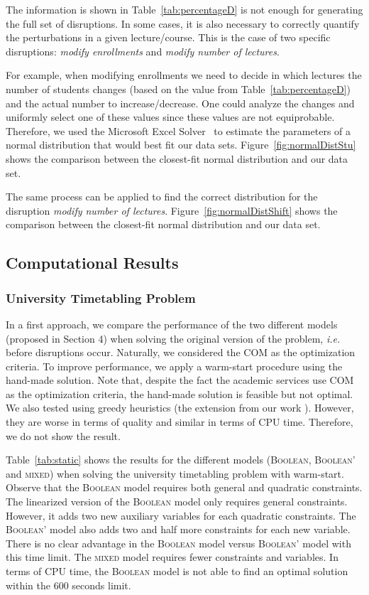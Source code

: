 \documentclass[twocolumn,natbib]{svjour3}          %
\newcounter{constraint}
\begin{document}
The information is shown in Table~\ref{tab:percentageD} is not enough for generating the full set of disruptions. In some cases, it is also necessary to correctly quantify the perturbations in a given lecture/course. This is the case of two specific disruptions: \textit{modify enrollments} and \textit{modify number of lectures}.

 For example, when modifying enrollments we need to decide in which lectures the number of students changes (based on the value from Table~\ref{tab:percentageD}) and the actual number to increase/decrease. One could analyze the changes and uniformly select one of these values since these values are not equiprobable. Therefore, we used the Microsoft Excel Solver~\citep{DBLP:journals/interfaces/FylstraLWW98} to estimate the parameters of a normal distribution that would best fit our data sets. Figure~\ref{fig:normalDistStu} shows the comparison between the closest-fit normal distribution and our data set.

 The same process can be applied to find the correct distribution for the disruption \textit{modify number of lectures}. Figure~\ref{fig:normalDistShift} shows the comparison between the closest-fit normal distribution and our data set.
 
\subsection{Computational Results}


\subsubsection{University Timetabling Problem} 


In a first approach, we compare the performance of the two different models (proposed in Section 4) when solving the original version of the problem, \emph{i.e.} before disruptions occur. Naturally, we considered the COM as the optimization criteria.  To improve performance, we apply a warm-start procedure using the hand-made solution. Note that, despite the fact the academic services use COM as the optimization criteria, the hand-made solution is feasible but not optimal. We also tested using greedy heuristics (the extension from our work \citep{LEMOS2018100092}). However, they are worse in terms of quality and similar in terms of CPU time. Therefore, we do not show the result.

Table~\ref{tab:static} shows the results for the different models (\textsc{Boolean}, \textsc{Boolean'} and \textsc{mixed}) when solving the university timetabling problem with warm-start. Observe that the \textsc{Boolean} model requires both general and quadratic constraints. The linearized version of the \textsc{Boolean} model only requires general constraints. However, it adds two new auxiliary variables for each quadratic constraints. The \textsc{Boolean'} model also adds two and half more constraints for each new variable. There is no clear advantage in the \textsc{Boolean} model versus \textsc{Boolean'} model with this time limit.  The \textsc{mixed} model requires fewer constraints and variables. In terms of CPU time, the \textsc{Boolean} model is not able to find an optimal solution within the 600 seconds limit. 
\end{document}

